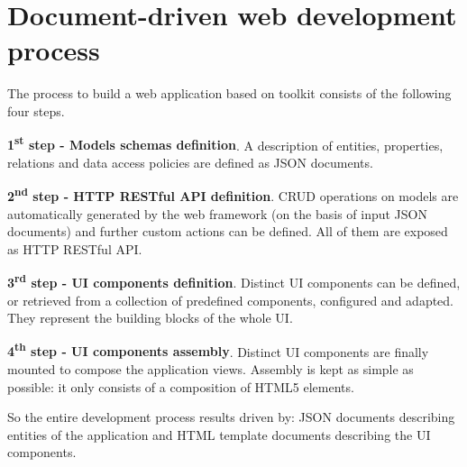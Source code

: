 \section{Document-driven web development process}\label{sec:dev-proc}

The process to build a web application based on  toolkit consists of the following four steps.

{\bf 1\textsuperscript{st} step - Models schemas definition}. A description of entities, properties, relations and data access policies are defined as JSON documents.

{\bf 2\textsuperscript{nd} step - HTTP RESTful API definition}. CRUD operations on models are automatically generated by the web framework (on the basis of input JSON documents) and further custom actions can be defined. All of them are exposed as HTTP RESTful API.

{\bf 3\textsuperscript{rd} step - UI components definition}. Distinct UI components can be defined, or retrieved from a collection of predefined components, configured and adapted. They represent the building blocks of the whole UI.

{\bf 4\textsuperscript{th} step - UI components assembly}. Distinct UI components are finally mounted to compose the application views. Assembly is kept as simple as possible: it only consists of a composition of HTML5 elements.

\vspace{0.2cm}

So the entire development process results driven by: JSON documents describing entities of the application and HTML template documents describing the UI components.



